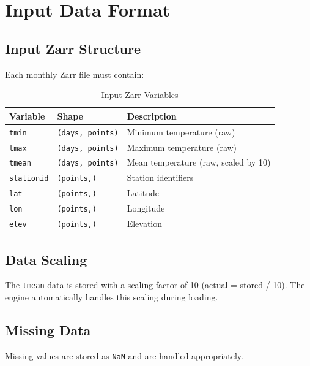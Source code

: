 ﻿\documentclass[12pt,a4paper]{report}
\begin{document}
\chapter{Input Data Format}
\section{Input Zarr Structure}
Each monthly Zarr file must contain:
\begin{table}[H]
    \centering
    \caption{Input Zarr Variables}
    \begin{tabular}{l l l}
        \toprule
        \textbf{Variable} & \textbf{Shape} & \textbf{Description} \\
        \midrule
        \texttt{tmin} & \texttt{(days, points)} & Minimum temperature (raw) \\
        \texttt{tmax} & \texttt{(days, points)} & Maximum temperature (raw) \\
        \texttt{tmean} & \texttt{(days, points)} & Mean temperature (raw, scaled by 10) \\
        \texttt{stationid} & \texttt{(points,)} & Station identifiers \\
        \texttt{lat} & \texttt{(points,)} & Latitude \\
        \texttt{lon} & \texttt{(points,)} & Longitude \\
        \texttt{elev} & \texttt{(points,)} & Elevation \\
        \bottomrule
    \end{tabular}
\end{table}

\section{Data Scaling}
The \texttt{tmean} data is stored with a scaling factor of 10 (actual = stored / 10). The engine automatically handles this scaling during loading.

\section{Missing Data}
Missing values are stored as \texttt{NaN} and are handled appropriately.

\end{document}
